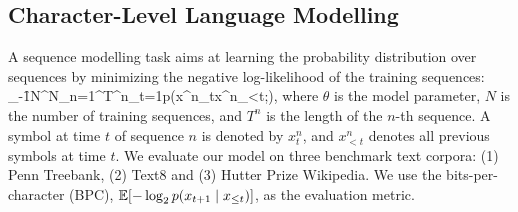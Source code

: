 \documentclass{article} %
\begin{document}
\subsection{Character-Level Language Modelling}
A sequence modelling task aims at learning the probability distribution over sequences by minimizing the negative log-likelihood of the training sequences:
\bea
	\label{eq:sequence_task}
	\min_{\theta}-\f{1}{N}\sum^{N}_{n=1}\sum^{T^n}_{t=1}\log p\left(x^n_t\mid x^n_{<t};\theta\right),
\eea
where $\theta$ is the model parameter, $N$ is the number of training sequences, 
and $T^n$ is the length of the $n$-th sequence. A symbol at time $t$ of sequence $n$ is denoted by $x_t^n$,
and $x^n_{<t}$ denotes all previous symbols at time $t$.
We evaluate our model on three benchmark text corpora: (1) Penn Treebank, (2) Text8 and (3) Hutter Prize Wikipedia.
We use the bits-per-character (BPC), $\mathbb{E}[-\log_2 p(x_{t+1} \mid x_{\leq t})]$, as the evaluation metric.
\end{document}
